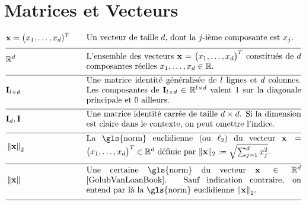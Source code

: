 \section*{Matrices et Vecteurs} 

\begin{align} 
	&\featurevec=\big(\feature_{1},\ldots,\feature_{\featuredim})^{T} &\quad & \parbox{.75\textwidth}{Un vecteur de taille $\featuredim$, dont la $\featureidx$-ième composante est $\feature_{\featureidx}$.} \nonumber \\[2mm] \hline \nonumber\\[-5mm]
	&\mathbb{R}^{\featuredim} & \quad &  \parbox{.75\textwidth}{L’ensemble des vecteurs $\featurevec=\big(\feature_{1},\ldots,\feature_{\featurelen}\big)^{T}$ constitués de $\featuredim$ composantes réelles $\feature_{1},\ldots,\feature_{\featurelen} \in \mathbb{R}$.} \nonumber \\[2mm] \hline \nonumber\\[-5mm]
	&\mathbf{I}_{\modelidx \times \featuredim}  & \quad &  \parbox{.75\textwidth}{Une matrice identité généralisée de $\modelidx$ lignes et $\featuredim$ colonnes. Les composantes de $\mathbf{I}_{\modelidx \times \featuredim} \in \mathbb{R}^{\modelidx \times \featuredim}$ valent $1$ sur la diagonale principale et $0$ ailleurs.} \nonumber \\[2mm] \hline \nonumber\\[-5mm]
	&\mathbf{I}_{\dimlocalmodel}, \mathbf{I} & \quad &  \parbox{.75\textwidth}{Une matrice identité carrée de taille $\dimlocalmodel \times \dimlocalmodel$. Si la dimension est claire dans le contexte, on peut omettre l'indice.} \nonumber \\[2mm] \hline \nonumber\\[-5mm]
	&\normgeneric{\featurevec}{2}  &\quad & \parbox{.75\textwidth}{La \gls{norm} euclidienne (ou $\ell_{2}$) du vecteur $\featurevec=\big(\feature_{1},\ldots,\feature_{\featurelen}\big)^{T} \in \mathbb{R}^{\featuredim}$ définie par $ \| \featurevec \|_{2} \defeq \sqrt{\sum_{\featureidx=1}^{\featuredim} \feature_{\featureidx}^{2}}$.} \nonumber \\[2mm] \hline \nonumber\\[-5mm] 
	&\normgeneric{\featurevec}{}  & \quad &  \parbox{.75\textwidth}{Une certaine \gls{norm} du vecteur $\featurevec \in \mathbb{R}^{\featuredim}$ \cite{GolubVanLoanBook}. Sauf indication contraire, on entend par là la \gls{norm} euclidienne $\normgeneric{\featurevec}{2}$.} \nonumber \\[2mm] \hline \nonumber\\[-5mm]

\end{align}
